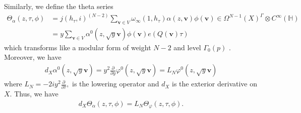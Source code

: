 \documentclass[twoside,a4paper,10pt]{article} %
\newcommand{\dbar}{\frac{\partial}{\partial \bar{\tau}}}
\newcommand{\8}{\infty}
\newcommand{\vbf}{\mathbf{v}}
\newcommand{\HH}{\mathbb{H}}
\theoremstyle{mytheoremstyle}
\theoremstyle{remark}
\numberwithin{equation}{section}
\begin{document}
Similarly, we define the theta series 
\begin{align} \label{thetalpha}
\Theta_{\alpha}(z,\tau,\phi)&=j(h_\tau,i)^{(N-2)} \sum_{\vbf \in V} \omega_\8(1,h_\tau)\alpha(z,\vbf)\phi(\vbf) \in \Omega^{N-1}(X)^{\Gamma} \otimes C^\8(\HH) \\
& =y\sum_{\vbf \in V} \alpha^0(z,\sqrt{y}\vbf) \phi(\vbf)e(Q(\vbf)\tau)
\end{align}
which transforms like a modular form of weight $N-2$ and level $\Gamma_0(p)$ . Moreover, we have
\begin{align} 
d_X\alpha^0(z,\sqrt{y}\vbf)=y^2 \frac{\partial}{\partial y}\varphi^0(z,\sqrt{y}\vbf)=L_N \varphi^0(z,\sqrt{y}\vbf)
\end{align}
where $L_N=-2iy^2\dbar,$ is the lowering operator and $d_X$ is the exterior derivative on $X$. Thus, we have \cite[Theorem.~4.19]{rbrsln}
\begin{align} \label{transgressionformula}
d_X\Theta_{\alpha}(z,\tau,\phi)=L_N \Theta_{\varphi}(z,\tau,\phi).
\end{align}
\end{document}
